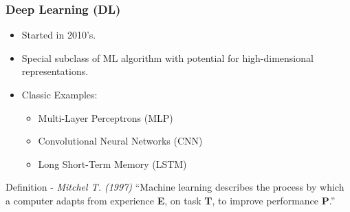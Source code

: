 \documentclass{beamer}
\begin{document}
\begin{frame}

\frametitle{Deep Learning (DL)}

\begin{itemize}
    \item Started in 2010's.
    \item Special subclass of ML algorithm with potential for high-dimensional representations.
    \item Classic Examples:
    \begin{itemize}
        \item Multi-Layer Perceptrons (MLP)
        \item Convolutional Neural Networks (CNN)
        \item Long Short-Term Memory (LSTM)
    \end{itemize}
\end{itemize}

\end{frame}

\begin{frame}

\begin{block}{Definition - \textit{Mitchel T. (1997)}}
    ``Machine learning describes the process by which a computer adapts
    from experience \textbf{E}, on task \textbf{T}, to improve
    performance \textbf{P}.''
\end{block}
    
\end{frame}
\end{document}
